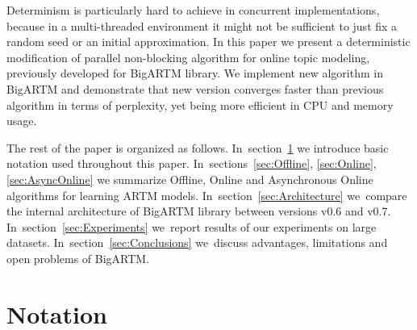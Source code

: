 \documentclass[russian,english]{llncs}
\begin{document}
Determinism is particularly hard to achieve
in concurrent implementations, because in a multi-threaded environment
it might not be sufficient to just fix a random seed or an initial approximation.
In this paper we present a deterministic modification of parallel non-blocking algorithm
for online topic modeling, previously developed for BigARTM library.
We implement new algorithm in BigARTM and demonstrate that new version converges faster
than previous algorithm in terms of perplexity,
yet being more efficient in CPU and memory usage.

The rest of the paper is organized as follows.
In~section~\ref{sec:Notation}
we introduce basic notation used throughout this paper.
In~sections~\ref{sec:Offline}, \ref{sec:Online}, \ref{sec:AsyncOnline}
we summarize Offline, Online and Asynchronous Online algorithms for learning ARTM models.
In~section~\ref{sec:Architecture}
we~compare the internal architecture of BigARTM library between versions v0.6 and v0.7.
In~section~\ref{sec:Experiments}
we~report results of our experiments on large datasets.
In~section~\ref{sec:Conclusions}
we~discuss advantages, limitations and open problems of BigARTM.


\section{Notation}
\label{sec:Notation}
\end{document}
